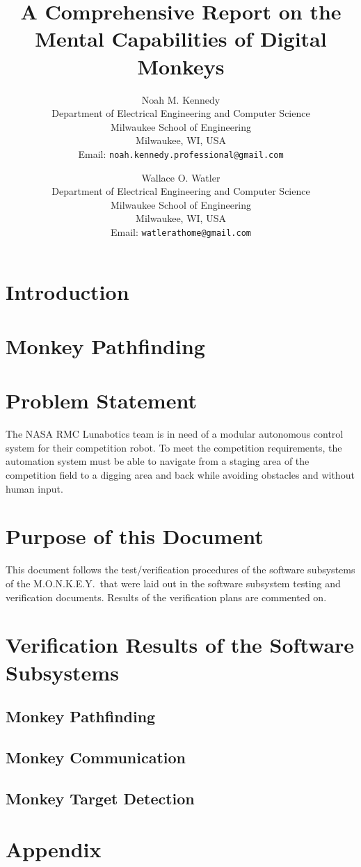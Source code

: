 \documentclass[11pt]{article}
\title{
    A Comprehensive Report on the Mental Capabilities of Digital Monkeys
}
\author{
    Noah M. Kennedy \\[3pt]
    {\small Department of Electrical Engineering and Computer Science} \\
    {\small Milwaukee School of Engineering} \\
    {\small Milwaukee, WI, USA} \\
    {\small Email: {\tt noah.kennedy.professional@gmail.com}} \\[12pt]
\and
    Wallace O. Watler \\[3pt]
    {\small Department of Electrical Engineering and Computer Science} \\
    {\small Milwaukee School of Engineering} \\
    {\small Milwaukee, WI, USA} \\
    {\small Email: {\tt watlerathome@gmail.com}} \\[12pt]
}
\date{}
\begin{document}
    \maketitle

    \abstract
    

    \newpage

    \tableofcontents

    \newpage

    \section{Introduction}\label{sec:introduction}
    

    \section{Monkey Pathfinding}\label{sec:monkey-pathfinding}
    \section{Problem Statement}\label{sec:problem-statement}
    The NASA RMC Lunabotics team is in need of a modular autonomous control system for their competition robot.
    To meet the competition requirements, the automation system must be able to navigate from a staging area of the
    competition field to a digging area and back while avoiding obstacles and without human input.

    \section{Purpose of this Document}\label{sec:purpose}
    This document follows the test/verification procedures of the software subsystems of the M.O.N.K.E.Y.\ that were
    laid out in the software subsystem testing and verification documents. Results of the verification plans are
    commented on.

    \section{Verification Results of the Software Subsystems}\label{sec:software-subsystems-results}

    \subsection{Monkey Pathfinding}\label{subsec:monkey-pathfinding}
    

    \subsection{Monkey Communication}\label{subsec:monkey-communication}
    

    \subsection{Monkey Target Detection}\label{subsec:monkey-target-detection}
    

    \section*{Appendix}\label{sec:appendix}

    \pagebreak

    \printbibliography
\end{document}
